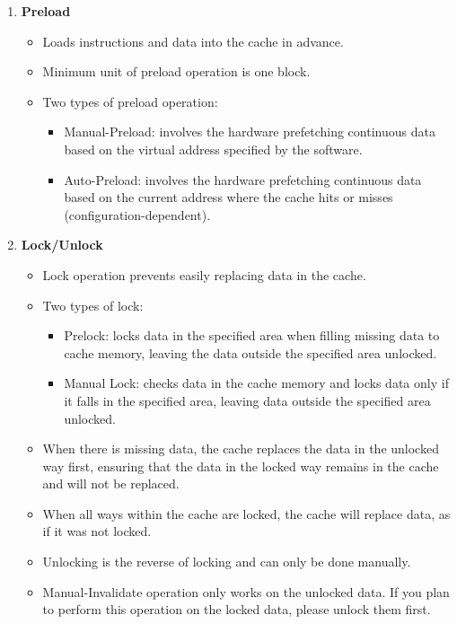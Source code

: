 \documentclass[main\_\_EN.tex]{subfiles}
\begin{document}
\begin{enumerate}
\item \textbf{Preload}
\begin{itemize}
    \item Loads instructions and data into the cache in advance.
    \item Minimum unit of preload operation is one block.
    \item Two types of preload operation:
    \begin{itemize}
    \item Manual-Preload: involves the hardware prefetching continuous data based on the virtual address specified by the software.
    \item Auto-Preload: involves the hardware prefetching continuous data based on the current address where the cache hits or misses (configuration-dependent).
    \end{itemize}
\end{itemize}

\item \textbf{Lock/Unlock}
\begin{itemize}
    \item Lock operation prevents easily replacing data in the cache.
    \item Two types of lock:
    \begin{itemize}
    \item Prelock: locks data in the specified area when filling missing data to cache memory, leaving the data outside the specified area unlocked.
    \item Manual Lock: checks data in the cache memory and locks data only if it falls in the specified area, leaving data outside the specified area unlocked.
    \end{itemize}
    \item When there is missing data, the cache replaces the data in the unlocked way first, ensuring that the data in the locked way remains in the cache and will not be replaced.
    \item When all ways within the cache are locked, the cache will replace data, as if it was not locked.
    \item Unlocking is the reverse of locking and can only be done manually.
    \item Manual-Invalidate operation only works on the unlocked data. If you plan to perform this operation on the locked data, please unlock them first.
    
\end{itemize}
\end{enumerate}
\end{document}
